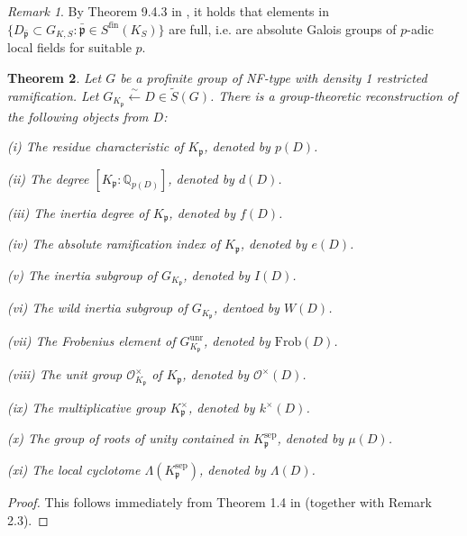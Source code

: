 \documentclass{article}
\newtheorem{thm}{Theorem}[section]
\theoremstyle{plain}
\theoremstyle{definition}
\theoremstyle{remark}
\newtheorem{rem}[thm]{Remark}
\begin{document}
\begin{rem}
By Theorem 9.4.3 in \cite{NSW}, it holds that elements in $\{D_{\bar{\mathfrak{p}}} \subset G_{K,S}: \bar{\mathfrak{p}} \in S^{\text{fin}}(K_S)\}$ are full, i.e. are absolute Galois groups of $p$-adic local fields for suitable $p$.
\end{rem}
\begin{thm}
Let $G$ be a profinite group of NF-type with density 1 restricted ramification. Let $G_{K_{\mathfrak{p}}}\xleftarrow{\sim}D \in \widetilde{S}(G)$. There is a group-theoretic reconstruction of the following objects from $D$: \par 
(i) The residue characteristic of $K_{\mathfrak{p}}$, denoted by $p(D)$.\par 
(ii) The degree $[K_{\mathfrak{p}}:\mathbb{Q}_{p(D)}]$, denoted by $d(D)$. \par 
(iii) The inertia degree of $K_{\mathfrak{p}}$, denoted by $f(D)$. \par 
(iv) The absolute ramification index of $K_{\mathfrak{p}}$, denoted by $e(D)$. \par 
(v) The inertia subgroup of $G_{K_{\mathfrak{p}}}$, denoted by $I(D)$. \par 
(vi) The wild inertia subgroup of $G_{K_{\mathfrak{p}}}$, dentoed by $W(D)$. \par 
(vii) The Frobenius element of $G_{K_{\mathfrak{p}}}^{\text{unr}}$, denoted by $\text{Frob}(D)$. \par 
(viii) The unit group $\mathcal{O}_{K_{\mathfrak{p}}}^{\times}$ of $K_{\mathfrak{p}}$, denoted by $\mathcal{O}^{\times}(D)$. \par 
(ix) The multiplicative group $K_{\mathfrak{p}}^{\times}$, denoted by $k^{\times}(D)$. \par 
(x) The group of roots of unity contained in $K_{\mathfrak{p}}^{\text{sep}}$, denoted by $\mu(D)$. \par 
(xi) The local cyclotome $\Lambda(K_{\mathfrak{p}}^{\text{sep}})$, denoted by $\Lambda(D)$.
\end{thm}
\begin{proof}
This follows immediately from Theorem 1.4 in \cite{Ho1} (together with Remark 2.3).
\end{proof}
\end{document}

